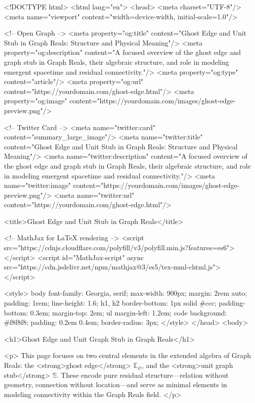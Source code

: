 <!DOCTYPE html>
<html lang="en">
<head>
  <meta charset="UTF-8"/>
  <meta name="viewport" content="width=device-width, initial-scale=1.0"/>

  <!-- Open Graph -->
  <meta property="og:title" content="Ghost Edge and Unit Stub in Graph Reals: Structure and Physical Meaning"/>
  <meta property="og:description" content="A focused overview of the ghost edge and graph stub in Graph Reals, their algebraic structure, and role in modeling emergent spacetime and residual connectivity."/>
  <meta property="og:type" content="article"/>
  <meta property="og:url" content="https://yourdomain.com/ghost-edge.html"/>
  <meta property="og:image" content="https://yourdomain.com/images/ghost-edge-preview.png"/>

  <!-- Twitter Card -->
  <meta name="twitter:card" content="summary_large_image"/>
  <meta name="twitter:title" content="Ghost Edge and Unit Stub in Graph Reals: Structure and Physical Meaning"/>
  <meta name="twitter:description" content="A focused overview of the ghost edge and graph stub in Graph Reals, their algebraic structure, and role in modeling emergent spacetime and residual connectivity."/>
  <meta name="twitter:image" content="https://yourdomain.com/images/ghost-edge-preview.png"/>
  <meta name="twitter:url" content="https://yourdomain.com/ghost-edge.html"/>

  <title>Ghost Edge and Unit Stub in Graph Reals</title>

  <!-- MathJax for LaTeX rendering -->
  <script src="https://cdnjs.cloudflare.com/polyfill/v3/polyfill.min.js?features=es6"></script>
  <script id="MathJax-script" async
    src="https://cdn.jsdelivr.net/npm/mathjax@3/es5/tex-mml-chtml.js">
  </script>

  <style>
    body { font-family: Georgia, serif; max-width: 900px; margin: 2rem auto; padding: 1rem; line-height: 1.6; }
    h1, h2 { border-bottom: 1px solid #ccc; padding-bottom: 0.3em; margin-top: 2em; }
    ul { margin-left: 1.2em; }
    code { background: #f8f8f8; padding: 0.2em 0.4em; border-radius: 3px; }
  </style>
</head>
<body>

  <h1>Ghost Edge and Unit Graph Stub in Graph Reals</h1>

  <p>
    This page focuses on two central elements in the extended algebra of Graph Reals:
    the <strong>ghost edge</strong> \(\mathbb E_\varnothing\), and the
    <strong>unit graph stub</strong> \(\mathbb S\). These encode pure residual structure—relation without geometry,
    connection without location—and serve as minimal elements in modeling connectivity within the Graph Reals field.
  </p>

